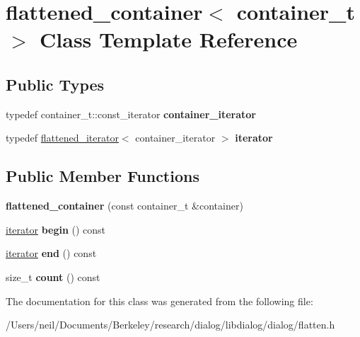 \hypertarget{classflattened__container}{}\section{flattened\+\_\+container$<$ container\+\_\+t $>$ Class Template Reference}
\label{classflattened__container}
\subsection*{Public Types}
\begin{DoxyCompactItemize}
\item 
\mbox{\label{classflattened__container_a2c8551a5517d3c4ab322adb5f8fe89ca}} 
typedef container\+\_\+t\+::const\+\_\+iterator {\bfseries container\+\_\+iterator}
\item 
\mbox{\label{classflattened__container_a946b681af098f8ca9070bc45aee46689}} 
typedef \hyperlink{classflattened__iterator}{flattened\+\_\+iterator}$<$ container\+\_\+iterator $>$ {\bfseries iterator}
\end{DoxyCompactItemize}
\subsection*{Public Member Functions}
\begin{DoxyCompactItemize}
\item 
\mbox{\label{classflattened__container_ab1e6eefefb570d8ac346466ff15a8f2f}} 
{\bfseries flattened\+\_\+container} (const container\+\_\+t \&container)
\item 
\mbox{\label{classflattened__container_a2c634637e352239a7e3a4a0c57f98a18}} 
\hyperlink{classflattened__iterator}{iterator} {\bfseries begin} () const
\item 
\mbox{\label{classflattened__container_a52b4b0d5e42919f44c94bcd1ef460c6d}} 
\hyperlink{classflattened__iterator}{iterator} {\bfseries end} () const
\item 
\mbox{\label{classflattened__container_ace9c80dc3b22ee88eadeaab4b1e63acc}} 
size\+\_\+t {\bfseries count} () const
\end{DoxyCompactItemize}


The documentation for this class was generated from the following file\+:\begin{DoxyCompactItemize}
\item 
/\+Users/neil/\+Documents/\+Berkeley/research/dialog/libdialog/dialog/flatten.\+h\end{DoxyCompactItemize}
